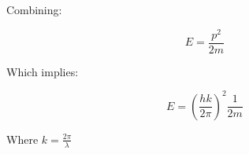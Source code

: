\documentclass{report}
\begin{document}
\begin{description}
\begin{mdframed}
            Combining:

            \begin{displaymath}
                E = \frac{p^2}{2m}
            \end{displaymath}
        
        \end{mdframed}
        \pagebreak
        \begin{mdframed}
            Which implies:

            \begin{displaymath}
                E = (\frac{hk}{2 \pi})^2 \frac{1}{2m}
            \end{displaymath}

            Where $k = \frac{2\pi}{\lambda}$ 
            
            
            
             
        \end{mdframed}
\end{description}
\end{document}
